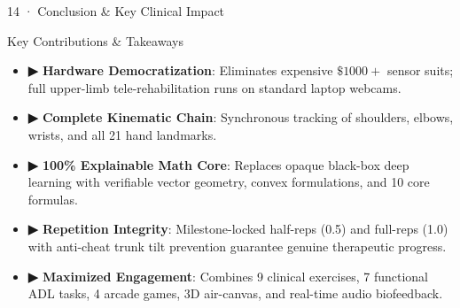 \documentclass[aspectratio=169,11pt]{beamer}
\begin{document}
\begin{frame}{14 · Conclusion \& Key Clinical Impact}
\begin{block}{Key Contributions \& Takeaways}
\begin{itemize}
    \setlength{\itemsep}{3.5pt}
    \item \textbf{▶ Hardware Democratization}: Eliminates expensive $\$1000+$ sensor suits; full upper-limb tele-rehabilitation runs on standard laptop webcams.
    \item \textbf{▶ Complete Kinematic Chain}: Synchronous tracking of shoulders, elbows, wrists, and all 21 hand landmarks.
    \item \textbf{▶ 100\% Explainable Math Core}: Replaces opaque black-box deep learning with verifiable vector geometry, convex formulations, and 10 core formulas.
    \item \textbf{▶ Repetition Integrity}: Milestone-locked half-reps (0.5) and full-reps (1.0) with anti-cheat trunk tilt prevention guarantee genuine therapeutic progress.
    \item \textbf{▶ Maximized Engagement}: Combines 9 clinical exercises, 7 functional ADL tasks, 4 arcade games, 3D air-canvas, and real-time audio biofeedback.
\end{itemize}
\end{block}
\end{frame}

\begin{frame}[plain]
\end{frame}
\end{document}
